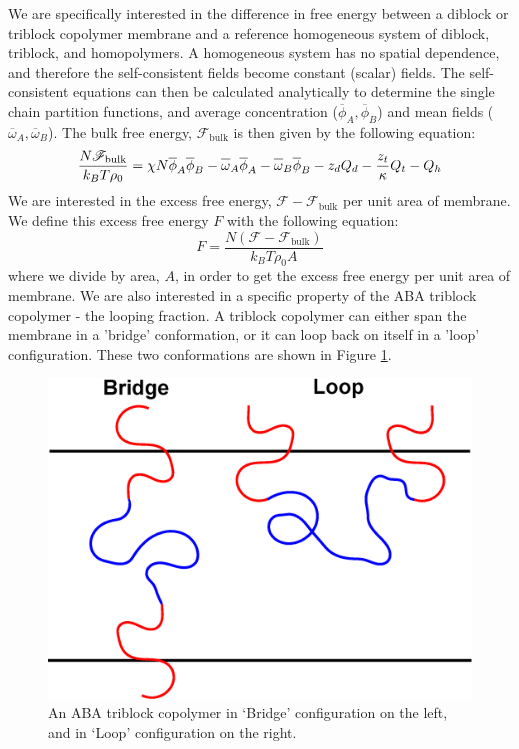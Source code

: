 \documentclass[twocolumn,aps,floatfix,nobibnotes]{revtex4-1}
\begin{document}
We are specifically interested in the difference in free energy between a diblock or triblock copolymer membrane and a reference homogeneous system of diblock, triblock, and homopolymers. A homogeneous system has no spatial dependence, and therefore the self-consistent fields become constant (scalar) fields. The self-consistent equations can then be calculated analytically to determine the single chain partition functions, and average concentration ($\overline{\phi}_A, \overline{\phi}_B$) and mean fields ($\overline{\omega}_A, \overline{\omega}_B$). The bulk free energy, $\mathscr{F}_\text{bulk}$ is then given by the following equation:
\begin{equation}
\frac{N \mathscr{F}_{\text{bulk}} }{k_B T \rho_0} = \chi N \overline{\phi}_A \overline{\phi}_B - \overline{\omega \vphantom{+1}}_A \overline{\phi}_A - \overline{\omega \vphantom{+1}}_B \overline{\phi}_B - z_d Q_d -  \frac{z_t}{\kappa}Q_t - Q_h
\end{equation}
We are interested in the excess free energy, $\mathscr{F} - \mathscr{F}_{\text{bulk}}$ per unit area of membrane. We define this excess free energy $F$ with the following equation:
\begin{equation}
F = \dfrac{N (\mathscr{F} - \mathscr{F}_{\text{bulk}})}{k_B T \rho_0 A}
\end{equation}
where we divide by area, $A$, in order to get the excess free energy per unit area of membrane. We are also interested in a specific property of the ABA triblock copolymer  - the looping fraction. A triblock copolymer can either span the membrane in a 'bridge' conformation, or it can loop back on itself in a 'loop' configuration. These two conformations are shown in Figure \ref{fig:bridge_loop}. 

\begin{figure}[htp]
\centering
\includegraphics[width=1.0\columnwidth]{loopandbridge_polymer.eps}
\caption{An ABA triblock copolymer in `Bridge' configuration on the left, and in `Loop' configuration on the right. }
\label{fig:bridge_loop}
\centering
\end{figure}
\end{document}

